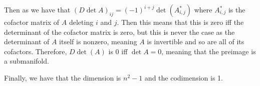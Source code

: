 \documentclass{article}
\theoremstyle{definition}
\numberwithin{theorem}{section}
\numberwithin{equation}{section}
\begin{document}
Then as we have that $(D \det A)_{ij} = (-1)^{i + j} \det(A^*_{i, j})$ where $A^*_{i, j}$ is the cofactor matrix of $A$ deleting $i$ and $j$. Then this means that this is zero iff the determinant of the cofactor matrix is zero, but this is never the case as the determinant of $A$ itself is nonzero, meaning $A$ is invertible and so are all of its cofactors. Therefore, $D \det(A)$ is 0 iff $\det A = 0$, meaning that the preimage is a submanifold. 

Finally, we have that the dimension is $n^2-1$ and the codimension is 1. 
\end{document}
